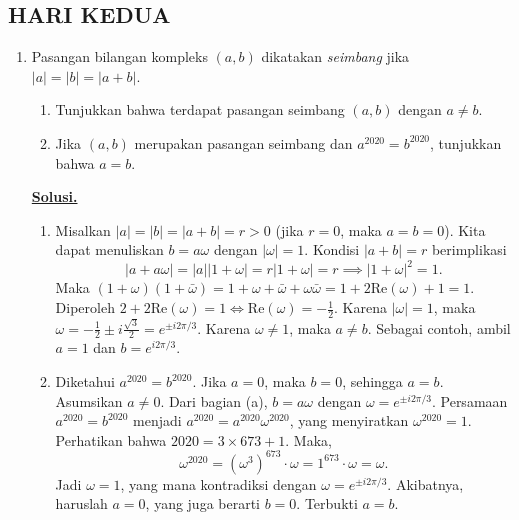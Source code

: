 \documentclass[12pt,twoside]{article}
\newenvironment{solution}
{
	\par\noindent\textbf{\underline{Solusi.}}\\
}
{
	\par
}
\begin{document}
\subsection{HARI KEDUA}
\begin{enumerate}
  \item Pasangan bilangan kompleks $(a,b)$ dikatakan \textit{seimbang} jika $|a| = |b| = |a + b|$.
        \begin{enumerate}
          \item Tunjukkan bahwa terdapat pasangan seimbang $(a,b)$ dengan $a \ne b$.
          \item Jika $(a,b)$ merupakan pasangan seimbang dan $a^{2020} = b^{2020}$, tunjukkan bahwa $a = b$.
        \end{enumerate}

        \begin{solution}
          \begin{enumerate}
            \item[(a)] Misalkan $|a| = |b| = |a+b| = r > 0$ (jika $r=0$, maka $a=b=0$). Kita dapat menuliskan $b = a \omega$ dengan $|\omega| = 1$. Kondisi $|a+b| = r$ berimplikasi
                  \[ |a + a\omega| = |a| |1+\omega| = r |1+\omega| = r \implies |1+\omega|^2 = 1. \]
                  Maka $(1+\omega)(1+\bar{\omega}) = 1 + \omega + \bar{\omega} + \omega\bar{\omega} = 1 + 2\text{Re}(\omega) + 1 = 1$.
                  Diperoleh $2 + 2\text{Re}(\omega) = 1 \iff \text{Re}(\omega) = -\frac{1}{2}$.
                  Karena $|\omega|=1$, maka $\omega = -\frac{1}{2} \pm i\frac{\sqrt{3}}{2} = e^{\pm i 2\pi/3}$.
                  Karena $\omega \neq 1$, maka $a \neq b$. Sebagai contoh, ambil $a=1$ dan $b=e^{i 2\pi/3}$.

            \item[(b)] Diketahui $a^{2020} = b^{2020}$. Jika $a=0$, maka $b=0$, sehingga $a=b$. Asumsikan $a \neq 0$. Dari bagian (a), $b = a\omega$ dengan $\omega = e^{\pm i 2\pi/3}$.
                  Persamaan $a^{2020} = b^{2020}$ menjadi $a^{2020} = a^{2020} \omega^{2020}$, yang menyiratkan $\omega^{2020} = 1$.
                  Perhatikan bahwa $2020 = 3 \times 673 + 1$. Maka,
                  \[ \omega^{2020} = (\omega^3)^{673} \cdot \omega = 1^{673} \cdot \omega = \omega. \]
                  Jadi $\omega = 1$, yang mana kontradiksi dengan $\omega = e^{\pm i 2\pi/3}$.
                  Akibatnya, haruslah $a=0$, yang juga berarti $b=0$. Terbukti $a=b$.
          \end{enumerate}
        \end{solution}


\end{enumerate}
\end{document}
